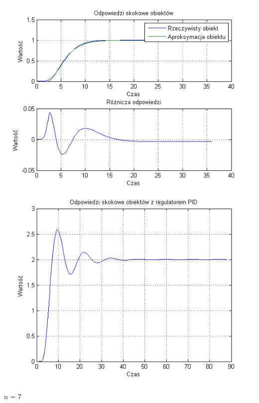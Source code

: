 \documentclass[10pt,a4paper]{article}
\begin{document}
\begin{center}
\includegraphics[scale=1]{images/dwa/skrypt_111.png}\\
\includegraphics[scale=1]{images/dwa/skrypt_112.png}\\
\end{center}
\newpage
n = 7
\end{document}
